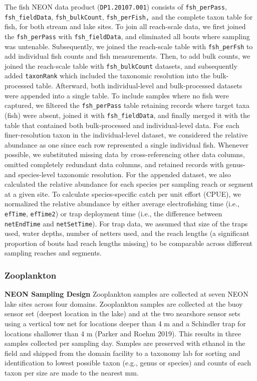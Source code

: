 \documentclass[
  12pt,
]{article}
\begin{document}
The fish NEON data product (\texttt{DP1.20107.001}) consists of \texttt{fsh\_perPass}, \texttt{fsh\_fieldData}, \texttt{fsh\_bulkCount}, \texttt{fsh\_perFish,} and the complete taxon table for fish, for both stream and lake sites. To join all reach-scale data, we first joined the \texttt{fsh\_perPass} with \texttt{fsh\_fieldData}, and eliminated all bouts where sampling was untenable. Subsequently, we joined the reach-scale table with \texttt{fsh\_perFsh} to add individual fish counts and fish measurements. Then, to add bulk counts, we joined the reach-scale table with \texttt{fsh\_bulkCount} datasets, and subsequently added \texttt{taxonRank} which included the taxonomic resolution into the bulk-processed table. Afterward, both individual-level and bulk-processed datasets were appended into a single table. To include samples where no fish were captured, we filtered the \texttt{fsh\_perPass} table retaining records where target taxa (fish) were absent, joined it with \texttt{fsh\_fieldData}, and finally merged it with the table that contained both bulk-processed and individual-level data. For each finer-resolution taxon in the individual-level dataset, we considered the relative abundance as one since each row represented a single individual fish. Whenever possible, we substituted missing data by cross-referencing other data columns, omitted completely redundant data columns, and retained records with genus- and species-level taxonomic resolution. For the appended dataset, we also calculated the relative abundance for each species per sampling reach or segment at a given site. To calculate species-specific catch per unit effort (CPUE), we normalized the relative abundance by either average electrofishing time (i.e., \texttt{efTime}, \texttt{efTime2}) or trap deployment time (i.e., the difference between \texttt{netEndTime} and \texttt{netSetTime}). For trap data, we assumed that size of the traps used, water depths, number of netters used, and the reach lengths (a significant proportion of bouts had reach lengths missing) to be comparable across different sampling reaches and segments.

\hypertarget{zooplankton}{%
\subsubsection{Zooplankton}\label{zooplankton}}

\textbf{NEON Sampling Design} Zooplankton samples are collected at seven NEON lake sites across four domains. Zooplankton samples are collected at the buoy sensor set (deepest location in the lake) and at the two nearshore sensor sets using a vertical tow net for locations deeper than 4 m and a Schindler trap for locations shallower than 4 m (Parker and Roehm 2019). This results in three samples collected per sampling day. Samples are preserved with ethanol in the field and shipped from the domain facility to a taxonomy lab for sorting and identification to lowest possible taxon (e.g., genus or species) and counts of each taxon per size are made to the nearest mm.
\end{document}
